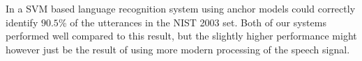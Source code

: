 In \cite{noor2006efficient} a SVM based language recognition system using anchor models could correctly identify $90.5$\% of the utterances in the NIST 2003 set. Both of our systems performed well compared to this result, but the slightly higher performance might however just be the result of using more modern processing of the speech signal.